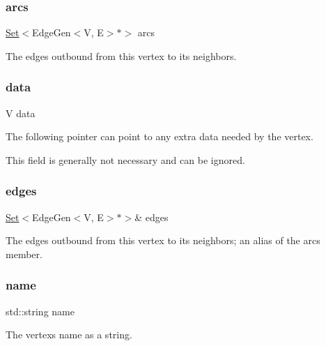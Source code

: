 \subsubsection{\texorpdfstring{arcs}{arcs}}
{\footnotesize\ttfamily \mbox{\hyperlink{classSet}{Set}}$<$Edge\+Gen$<$V, E$>$$\ast$$>$ arcs}



The edges outbound from this vertex to its neighbors. 

\mbox{\label{classVertexGen_a0cff2e152738a487e0930e21b7824c40}} 
\subsubsection{\texorpdfstring{data}{data}}
{\footnotesize\ttfamily V data}



The following pointer can point to any extra data needed by the vertex. 

This field is generally not necessary and can be ignored. \mbox{\label{classVertexGen_a795e7fd80b24c26fdd9fa879db40a403}} 
\subsubsection{\texorpdfstring{edges}{edges}}
{\footnotesize\ttfamily \mbox{\hyperlink{classSet}{Set}}$<$Edge\+Gen$<$V, E$>$$\ast$$>$\& edges}



The edges outbound from this vertex to its neighbors; an alias of the \textquotesingle{}arcs\textquotesingle{} member. 

\mbox{\label{classVertexGen_a9b45b3e13bd9167aab02e17e08916231}} 
\subsubsection{\texorpdfstring{name}{name}}
{\footnotesize\ttfamily std\+::string name}



The vertex\textquotesingle{}s name as a string. 

